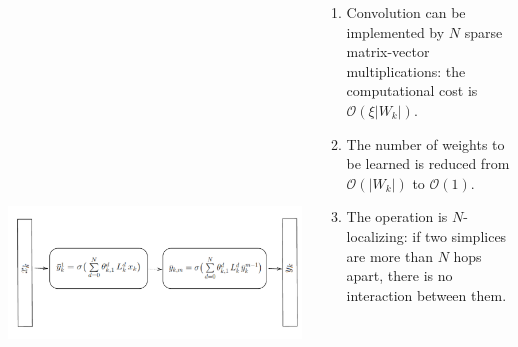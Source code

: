 \documentclass[landscape,a0paper,blockverticalspace = 5mm]{tikzposter}
\begin{document}
\begin{columns}
{{    \begin{center}
          \includegraphics[height=15cm]{figures/nets.pdf}
          \end{center}

\begin{enumerate}
\vspace{-2cm}
\item Convolution can be implemented by $N$ sparse matrix-vector multiplications: the computational cost is $\mathcal{O}(\xi\lvert W_k\rvert)$.
\item The number of weights to be learned is reduced from $\mathcal{O}(\lvert W_k\rvert)$ to $\mathcal{O}(1)$.
\item The operation is $N$-localizing: if two simplices are more than $N$ hops apart, there is no interaction between them.
\end{enumerate}

    }    
    
   
  

  }
  
\end{columns}
\end{document}
